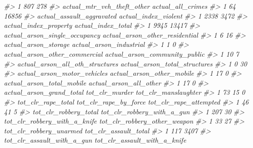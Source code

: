 \documentclass[
]{krantz}
\makeatletter
\newenvironment{Shaded}{\begin{snugshade}}{\end{snugshade}}
\newcommand{\CommentTok}[1]{\textcolor[rgb]{0.37,0.37,0.37}{\textit{#1}}}
\newenvironment{kframe}{%
\medskip{}
\setlength{\fboxsep}{.8em}
 \def\at@end@of@kframe{}%
 \ifinner\ifhmode%
  \def\at@end@of@kframe{\end{minipage}}%
  \begin{minipage}{\columnwidth}%
 \fi\fi%
 \def\FrameCommand##1{\hskip\@totalleftmargin \hskip-\fboxsep
 \colorbox{shadecolor}{##1}\hskip-\fboxsep
     \hskip-\linewidth \hskip-\@totalleftmargin \hskip\columnwidth}%
 \MakeFramed {\advance\hsize-\width
   \@totalleftmargin\z@ \linewidth\hsize
   \@setminipage}}%
 {\par\unskip\endMakeFramed%
 \at@end@of@kframe}
\renewenvironment{Shaded}{\begin{kframe}}{\end{kframe}}
\makeatother
\begin{document}
\begin{Shaded}
\begin{Highlighting}[]
\CommentTok{\#\textgreater{} 1                      807                        278}
\CommentTok{\#\textgreater{}   actual\_mtr\_veh\_theft\_other actual\_all\_crimes}
\CommentTok{\#\textgreater{} 1                         64             16856}
\CommentTok{\#\textgreater{}   actual\_assault\_aggravated actual\_index\_violent}
\CommentTok{\#\textgreater{} 1                      2338                 3472}
\CommentTok{\#\textgreater{}   actual\_index\_property actual\_index\_total}
\CommentTok{\#\textgreater{} 1                  9945              13417}
\CommentTok{\#\textgreater{}   actual\_arson\_single\_occupancy actual\_arson\_other\_residential}
\CommentTok{\#\textgreater{} 1                             6                             16}
\CommentTok{\#\textgreater{}   actual\_arson\_storage actual\_arson\_industrial}
\CommentTok{\#\textgreater{} 1                    1                       0}
\CommentTok{\#\textgreater{}   actual\_arson\_other\_commercial actual\_arson\_community\_public}
\CommentTok{\#\textgreater{} 1                            10                             7}
\CommentTok{\#\textgreater{}   actual\_arson\_all\_oth\_structures actual\_arson\_total\_structures}
\CommentTok{\#\textgreater{} 1                               0                            30}
\CommentTok{\#\textgreater{}   actual\_arson\_motor\_vehicles actual\_arson\_other\_mobile}
\CommentTok{\#\textgreater{} 1                          17                         0}
\CommentTok{\#\textgreater{}   actual\_arson\_total\_mobile actual\_arson\_all\_other}
\CommentTok{\#\textgreater{} 1                        17                      0}
\CommentTok{\#\textgreater{}   actual\_arson\_grand\_total tot\_clr\_murder tot\_clr\_manslaughter}
\CommentTok{\#\textgreater{} 1                       73             15                    0}
\CommentTok{\#\textgreater{}   tot\_clr\_rape\_total tot\_clr\_rape\_by\_force tot\_clr\_rape\_attempted}
\CommentTok{\#\textgreater{} 1                 46                    41                      5}
\CommentTok{\#\textgreater{}   tot\_clr\_robbery\_total tot\_clr\_robbery\_with\_a\_gun}
\CommentTok{\#\textgreater{} 1                   207                         30}
\CommentTok{\#\textgreater{}   tot\_clr\_robbery\_with\_a\_knife tot\_clr\_robbery\_other\_weapon}
\CommentTok{\#\textgreater{} 1                           33                           27}
\CommentTok{\#\textgreater{}   tot\_clr\_robbery\_unarmed tot\_clr\_assault\_total}
\CommentTok{\#\textgreater{} 1                     117                  3407}
\CommentTok{\#\textgreater{}   tot\_clr\_assault\_with\_a\_gun tot\_clr\_assault\_with\_a\_knife}

\end{Highlighting}
\end{Shaded}
\end{document}
